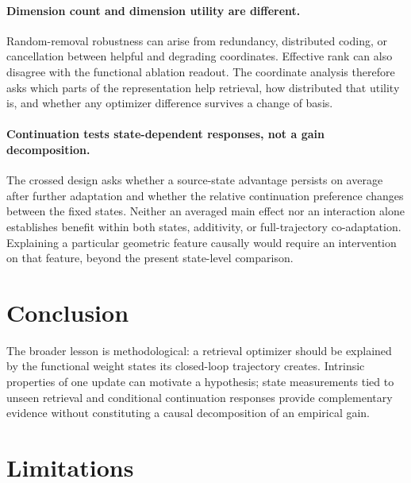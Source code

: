 \documentclass[11pt]{article}
\begin{document}
\paragraph{Dimension count and dimension utility are different.}
Random-removal robustness can arise from redundancy, distributed coding, or cancellation between
helpful and degrading coordinates. Effective rank can also disagree with the functional ablation
readout. The coordinate analysis therefore asks which parts of the representation help retrieval,
how distributed that utility is, and whether any optimizer difference survives a change of basis.

\paragraph{Continuation tests state-dependent responses, not a gain decomposition.}
The crossed design asks whether a source-state advantage persists on average after further
adaptation and whether the relative continuation preference changes between the fixed states.
Neither an averaged main effect nor an interaction alone establishes benefit within both states,
additivity, or full-trajectory co-adaptation. Explaining a particular geometric feature causally
would require an intervention on that feature, beyond the present state-level comparison.

\FloatBarrier

\section{Conclusion}

\CorrectedConclusionFinding

\DimensionConclusionFinding

\StateOperatorConclusionFinding

The broader lesson is methodological: a retrieval optimizer should be explained by the functional
weight states its closed-loop trajectory creates. Intrinsic properties of one update can motivate a
hypothesis; state measurements tied to unseen retrieval and conditional continuation responses
provide complementary evidence without constituting a causal decomposition of an empirical gain.

\label{paper-main-end}

\section{Limitations}
\end{document}
